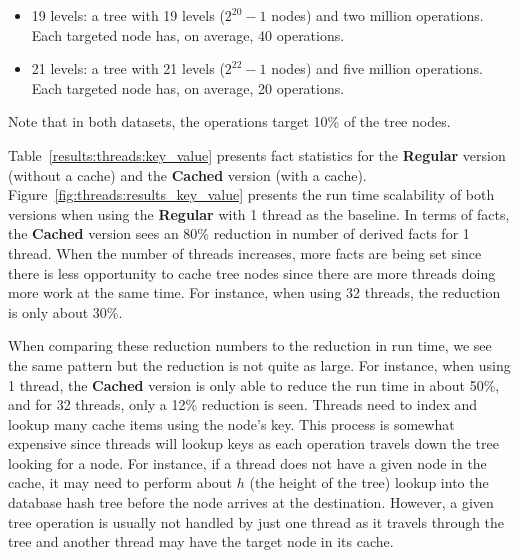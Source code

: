 \begin{itemize}
   \item 19 levels: a tree with 19 levels ($2^{20}-1$ nodes) and two million
      operations. Each targeted node has, on average, 40 operations.

   \item 21 levels: a tree with 21 levels ($2^{22}-1$ nodes) and five million
      operations. Each targeted node has, on average, 20 operations.
\end{itemize}

Note that in both datasets, the operations target 10\% of the tree nodes.

Table~\ref{results:threads:key_value} presents fact statistics for the
\textbf{Regular} version (without a cache) and the \textbf{Cached} version
(with a cache). Figure~\ref{fig:threads:results_key_value} presents the run time
scalability of both versions when using the \textbf{Regular} with 1 thread as
the baseline. In terms of facts, the \textbf{Cached} version sees an 80\%
reduction in number of derived facts for 1 thread. When the number of threads
increases, more facts are being set since there is less opportunity to cache
tree nodes since there are more threads doing more work at the same time. For
instance, when using 32 threads, the reduction is only about 30\%.

When comparing these reduction numbers to the reduction in run time, we see the
same pattern but the reduction is not quite as large. For instance, when using 1
thread, the \textbf{Cached} version is only able to reduce the run time in about
50\%, and for 32 threads, only a 12\% reduction is seen. Threads need to index
and lookup many cache items using the node's key. This process is somewhat
expensive since threads will lookup keys as each operation travels down the tree
looking for a node. For instance, if a thread does not have a given node in the
cache, it may need to perform about $h$ (the height of the tree) lookup into the
database hash tree before the node arrives at the destination.  However, a given
tree operation is usually not handled by just one thread as it travels through
the tree and another thread may have the target node in its cache.

\begin{table}[ht]
   \begin{center}
      
   \end{center}


   \label{results:threads:key_value}
\end{table}

